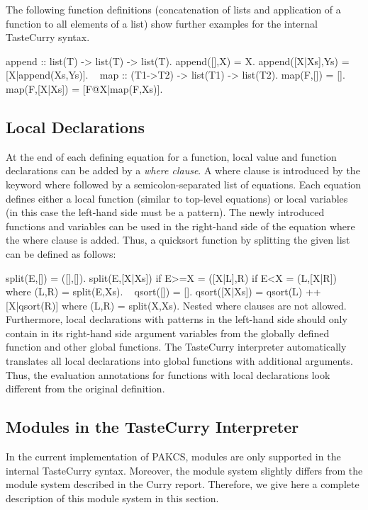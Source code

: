 \documentclass[11pt,fleqn]{article}
\makeatletter
\renewcommand{\tt}{\usefont{OT1}{cmtt}{m}{n}\selectfont}
\newcommand{\codefont}{\tt}
\newenvironment{prog}{\par\vspace{0.7ex}
\setlength{\parindent}{1.0cm}
\setlength{\parskip}{-0.1ex}
\obeylines\@vobeyspaces\tt}{\vspace{0.7ex}\noindent
}
\newcommand{\startprog}{\begin{prog}}
\newcommand{\stopprog}{\end{prog}\noindent}
\newcommand{\code}[1]{\mbox{\codefont #1}}
\makeatother
\begin{document}
The following function definitions (concatenation of lists and
application of a function to all elements of a list)
show further examples for the internal TasteCurry syntax.
\startprog
append :: list(T) -> list(T) -> list(T).
append([],X)      = X.
append([X|Xs],Ys) = [X|append(Xs,Ys)].
~ 
map :: (T1->T2) -> list(T1) -> list(T2). 
map(F,[])       = [].
map(F,[X|Xs])   = [F@X|map(F,Xs)].
~
\stopprog




\subsection*{Local Declarations}

At the end of each defining equation for a function,
local value and function declarations can be added by a
\emph{where clause}. A where clause is introduced by the keyword
\code{where} followed by a semicolon-separated list of equations.
Each equation defines either a local function (similar to top-level
equations) or local variables (in this case the left-hand side
must be a pattern). The newly introduced functions and variables can be used
in the right-hand side of the equation where the where clause
is added. Thus, a quicksort function by splitting
the given list can be defined as follows:
\startprog
split(E,[]) = ([],[]).
split(E,[X|Xs]) if E>=X = ([X|L],R)
                if E<X  = (L,[X|R])
                        where (L,R) = split(E,Xs).
~
qsort([])     = [].
qsort([X|Xs]) = qsort(L) ++ [X|qsort(R)]  where (L,R) = split(X,Xs).
\stopprog
Nested where clauses are not allowed. Furthermore,
local declarations with patterns in the left-hand side
should only contain in its right-hand side
argument variables from the globally defined function and other
global functions. The TasteCurry interpreter automatically
translates all local declarations into global functions with
additional arguments. Thus, the evaluation annotations for
functions with local declarations look different from
the original definition.


\subsection{Modules in the TasteCurry Interpreter}
\label{sec-tcmodules}

In the current implementation of PAKCS, modules are only supported
in the internal TasteCurry syntax. Moreover, the module system
slightly differs from the module system described in the
Curry report. Therefore, we give here a complete description
of this module system in this section.
\end{document}

